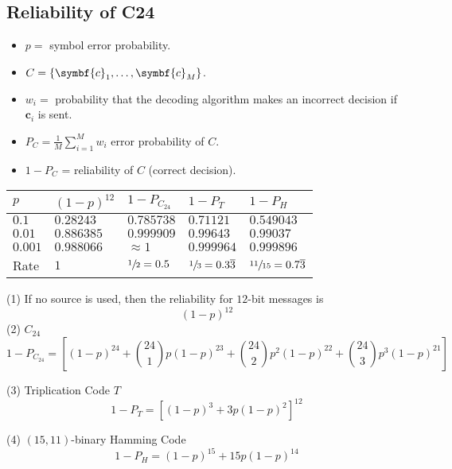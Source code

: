\subsection*{Reliability of C24}
\begin{itemize}
    \item $ p = $ symbol error probability.
    \item $ C=\set{\symbf{c}_1,\ldots ,\symbf{c}_M} $.
    \item $ w_i = $ probability that the decoding algorithm makes an incorrect
          decision if $ \symbf{c}_i $ is sent.
    \item $ P_C=\frac{1}{M} \sum\limits_{i=1}^{M} w_i $ error probability of $ C $.
    \item $ 1-P_C $ = reliability of $ C $ (correct decision).
\end{itemize}

\begin{table}[H]
    \centering
    \begin{tabularx}{\linewidth}{@{}YYYYY@{}}
        $ p $     & $ (1-p)^{12} $ & $ 1-P_{C_{24}} $     & $ 1-P_T $                        & $ 1-P_H $                          \\
        \midrule
        $ 0.1 $   & $ 0.28243 $    & $ 0.785738      $    & $ 0.71121      $                 & $ 0.549043       $                 \\
        $ 0.01 $  & $ 0.886385 $   & $ 0.999909      $    & $ 0.99643      $                 & $ 0.99037       $                  \\
        $ 0.001 $ & $ 0.988066 $   & $ \approx 1    $     & $ 0.999964     $                 & $ 0.999896        $                \\
        Rate      & $ 1        $   & $ \sfrac{1}{2}=0.5 $ & $ \sfrac{1}{3}=0.3\overline{3} $ & $ \sfrac{11}{15}= 0.7\overline{3}$ \\
    \end{tabularx}
\end{table}


(1) If no source is used, then the reliability for $ 12 $-bit messages is
\[ (1-p)^{12} \]
(2) $ C_{24} $
\[ 1-P_{C_{24}}=\left[ (1-p)^{24}+\binom{24}{1}p(1-p)^{23}+\binom{24}{2}p^2(1-p)^{22}
        + \binom{24}{3}p^3 (1-p)^{21} \right] \]

(3) Triplication Code $ T $
\[ 1-P_T=\left[ (1-p)^3+3p(1-p)^2 \right]^{12} \]

(4) $ (15,11) $-binary Hamming Code
\[ 1-P_H=(1-p)^{15}+15p(1-p)^{14} \]
